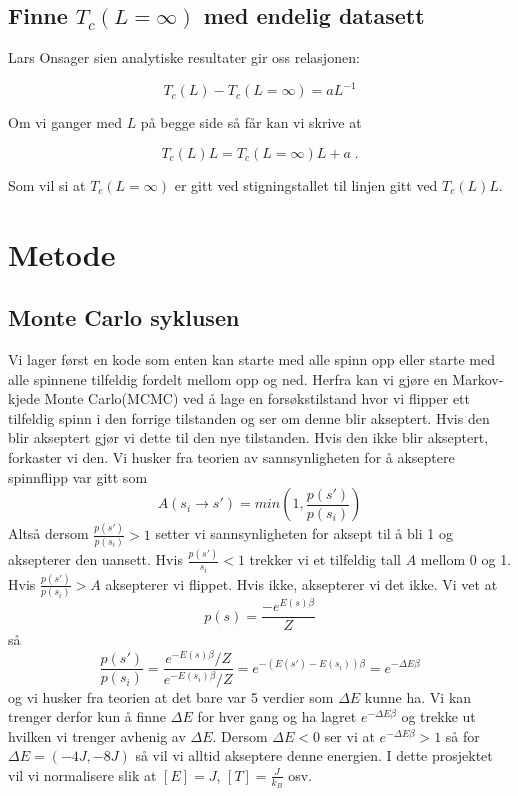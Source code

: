 \documentclass[reprint,english,notitlepage]{revtex4-2}  %
\begin{document}
\subsection*{Finne $T_c \left ( L = \infty \right ) $ med endelig datasett}

Lars Onsager sien analytiske resultater gir oss relasjonen:

$$ T_c \left ( L \right ) - T_c \left ( L = \infty \right ) = aL^{-1}$$

Om vi ganger med $L$ på begge side så får kan vi skrive at

\begin{equation}\label{Tinf}
T_c \left (L \right ) L = T_c \left ( L = \infty \right )L + a \; .
\end{equation}

Som vil si at $T_c \left ( L = \infty \right ) $ er gitt ved stigningstallet til linjen gitt ved $T_c \left ( L \right ) L $.

\section{Metode}

\subsection{Monte Carlo syklusen}
Vi lager først en kode som enten kan starte med alle spinn opp eller starte med alle spinnene tilfeldig fordelt mellom opp og ned. Herfra kan vi gjøre en Markov-kjede Monte Carlo(MCMC) ved å lage en forsøkstilstand hvor vi flipper ett tilfeldig spinn i den forrige tilstanden og ser om denne blir akseptert. Hvis den blir akseptert gjør vi dette til den nye tilstanden. Hvis den ikke blir akseptert, forkaster vi den. Vi husker fra teorien av sannsynligheten for å akseptere spinnflipp var gitt som
$$
A(s_i\rightarrow s')=min(1, \frac{p(s')}{p(s_i)})
$$
Altså dersom $\frac{p(s')}{p(s_i)}>1$ setter vi sannsynligheten for aksept til å bli 1 og aksepterer den uansett. Hvis $\frac{p(s')}{s_i}<1$ trekker vi et tilfeldig tall $A$ mellom 0 og 1. Hvis $\frac{p(s')}{p(s_i)}>A$ aksepterer vi flippet. Hvis ikke, aksepterer vi det ikke. Vi vet at
$$
p(s)=\frac{-e^{E(s)\beta}}{Z}
$$
så
$$
\frac{p(s')}{p(s_i)}=\frac{e^{-E(s)\beta}/Z}{e^{-E(s_i)\beta}/Z}=e^{-(E(s')-E(s_i))\beta}=e^{-\Delta E \beta}
$$
og vi husker fra teorien at det bare var 5 verdier som $\Delta E$ kunne ha. Vi kan trenger derfor kun å finne $\Delta E$ for hver gang og ha lagret $e^{-\Delta E \beta}$ og trekke ut hvilken vi trenger avhenig av $\Delta E$. Dersom $\Delta E<0$ ser vi at $e^{-\Delta E \beta}>1$ så for $\Delta E=(-4J, -8J)$ så vil vi alltid akseptere denne energien. I dette prosjektet vil vi normalisere slik at $[E]=J$, $[T]=\frac{J}{k_B}$ osv.
\end{document}
